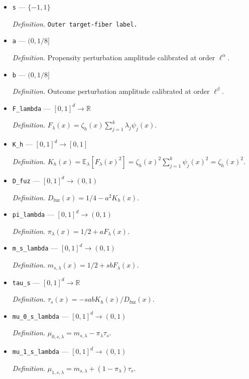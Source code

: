 \documentclass{article}
\begin{document}
\begin{itemize}
  \item \texttt{s} --- \(\{-1,1\}\)
  \par\smallskip\noindent\emph{Definition.} \texttt{Outer target-\allowbreak{}fiber label.}
  \item \texttt{a} --- \((0,1/8]\)
  \par\smallskip\noindent\emph{Definition.} Propensity perturbation amplitude calibrated at order \(\ell^\alpha\).
  \item \texttt{b} --- \((0,1/8]\)
  \par\smallskip\noindent\emph{Definition.} Outcome perturbation amplitude calibrated at order \(\ell^\beta\).
  \item \texttt{F\_\allowbreak{}lambda} --- \([0,1]^d\to\mathbb R\)
  \par\smallskip\noindent\emph{Definition.} \(F_\lambda(x)=\zeta_h(x)\sum_{j=1}^k\lambda_j\psi_j(x)\).
  \item \texttt{K\_\allowbreak{}h} --- \([0,1]^d\to[0,1]\)
  \par\smallskip\noindent\emph{Definition.} \(K_h(x)=\mathbb E_\lambda[F_\lambda(x)^2]=\zeta_h(x)^2\sum_{j=1}^k\psi_j(x)^2=\zeta_h(x)^2\).
  \item \texttt{D\_\allowbreak{}fuz} --- \([0,1]^d\to(0,1)\)
  \par\smallskip\noindent\emph{Definition.} \(D_{\mathrm{fuz}}(x)=1/4-a^2K_h(x)\).
  \item \texttt{pi\_\allowbreak{}lambda} --- \([0,1]^d\to(0,1)\)
  \par\smallskip\noindent\emph{Definition.} \(\pi_\lambda(x)=1/2+aF_\lambda(x)\).
  \item \texttt{m\_\allowbreak{}s\_\allowbreak{}lambda} --- \([0,1]^d\to(0,1)\)
  \par\smallskip\noindent\emph{Definition.} \(m_{s,\lambda}(x)=1/2+sbF_\lambda(x)\).
  \item \texttt{tau\_\allowbreak{}s} --- \([0,1]^d\to\mathbb R\)
  \par\smallskip\noindent\emph{Definition.} \(\tau_s(x)=-sabK_h(x)/D_{\mathrm{fuz}}(x)\).
  \item \texttt{mu\_\allowbreak{}0\_\allowbreak{}s\_\allowbreak{}lambda} --- \([0,1]^d\to(0,1)\)
  \par\smallskip\noindent\emph{Definition.} \(\mu_{0,s,\lambda}=m_{s,\lambda}-\pi_\lambda\tau_s\).
  \item \texttt{mu\_\allowbreak{}1\_\allowbreak{}s\_\allowbreak{}lambda} --- \([0,1]^d\to(0,1)\)
  \par\smallskip\noindent\emph{Definition.} \(\mu_{1,s,\lambda}=m_{s,\lambda}+(1-\pi_\lambda)\tau_s\).

\end{itemize}
\end{document}
